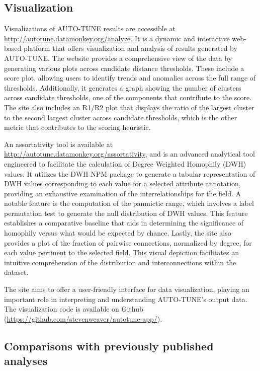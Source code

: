 \documentclass[utf8]{FrontiersinHarvard} %
\newcommand{\TODO}[1]{{\color{red}{#1}}}
\begin{document}
\subsection{Visualization}

Visualizations of AUTO-TUNE results are accessible at
\url{http://autotune.datamonkey.org/analyze}. It is a dynamic and interactive
web-based platform that offers visualization and analysis of results generated
by AUTO-TUNE. The website provides a comprehensive view of the data by
generating various plots across candidate distance thresholds. These include a
score plot, allowing users to identify trends and anomalies across the full
range of thresholds. Additionally, it generates a graph showing the number of
clusters across candidate thresholds, one of the components that contribute to
the score. The site also includes an R1/R2 plot that displays the ratio of the
largest cluster to the second largest cluster across candidate thresholds,
which is the other metric that contributes to the scoring heuristic. \TODO{this
	could benefit from referencing a figure showing such plots}

An assortativity tool is available at
\url{http://autotune.datamonkey.org/assortativity}, and is an advanced
analytical tool engineered to facilitate the calculation of Degree Weighted
Homophily (DWH) values. It utilizes the DWH NPM package to generate a tabular
representation of DWH values corresponding to each value for a selected
attribute annotation, providing an exhaustive examination of the
interrelationships for the field. A notable feature is the computation of the
panmictic range, which involves a label permutation test to generate the null
distribution of DWH values. This feature establishes a comparative baseline
that aids in determining the significance of homophily versus what would be
expected by chance. Lastly, the site also provides a plot of the fraction of
pairwise connections, normalized by degree, for each value pertinent to the
selected field. This visual depiction facilitates an intuitive comprehension of
the distribution and interconnections within the dataset.

The site aims to offer a user-friendly interface for data visualization,
playing an important role in interpreting and understanding AUTO-TUNE's output
data. The visualization code is available on Github
(\url{https://github.com/stevenweaver/autotune-app/}).

\subsection{Comparisons with previously published analyses}
\end{document}
